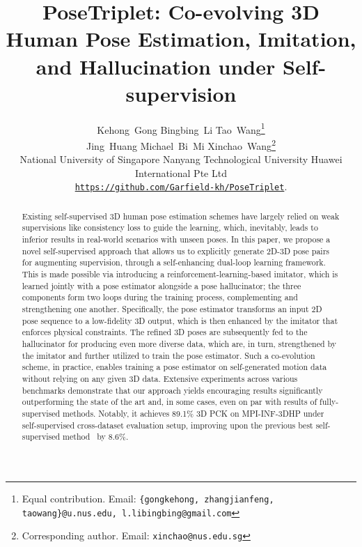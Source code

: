 \documentclass[10pt,twocolumn,letterpaper]{article}
\begin{document}
\title{PoseTriplet: Co-evolving 3D Human Pose Estimation, Imitation, and Hallucination under Self-supervision}










\author{
{Kehong~Gong\footnotemark[1]} \qquad \quad  
{Bingbing~Li\footnotemark[1]}  \quad  {}  \quad  \qquad 
{Tao~Wang\thanks{Equal contribution. 
Email: {\tt \{gongkehong, zhangjianfeng, taowang\}@u.nus.edu,
l.libingbing@gmail.com}}} \quad  \qquad \\
\quad 
{Jing~Huang} \qquad \quad  
{Michael~Bi~Mi}  \quad  {}  \quad  \qquad 
{Xinchao~Wang\footnotemark[2]\thanks{Corresponding author. Email: {\tt xinchao@nus.edu.sg}}} \quad  \qquad \\ 
\normalsize{National University of Singapore} \quad
\normalsize{Nanyang Technological University} \quad
\normalsize{Huawei International Pte Ltd }\\
{\tt \small{\url{https://github.com/Garfield-kh/PoseTriplet}}}.
}


\maketitle

\begin{abstract}
Existing self-supervised 3D human pose estimation schemes
have largely relied on weak supervisions like
consistency loss to guide the learning,
which, inevitably, leads to
inferior results in real-world 
scenarios with unseen poses. 
In this paper, we propose a novel self-supervised
approach that allows us to explicitly
generate 2D-3D pose pairs
for augmenting supervision,
through a self-enhancing 
dual-loop learning framework. 
This is made possible via 
introducing a
reinforcement-learning-based
imitator, which is learned jointly
with a pose estimator
alongside a pose hallucinator;
the three components
form two loops during the training process, 
complementing and strengthening one another. 
Specifically, 
the pose estimator transforms an input 2D pose sequence 
to a low-fidelity 3D output,
which is then enhanced by the imitator that
enforces physical constraints.
The refined 3D poses are subsequently 
fed to the hallucinator
for producing even more diverse data,
which are, in turn, 
strengthened by the imitator and further utilized to 
train the pose estimator. 
Such a co-evolution scheme, in practice, 
enables training a pose estimator 
on self-generated motion data without relying on any given 3D  data.
Extensive experiments 
across various  benchmarks
demonstrate that 
our approach yields encouraging 
results  significantly outperforming
the state of the art
and,
in some cases, even on par
with results of fully-supervised methods. 
{Notably, it achieves 89.1\% 3D PCK on MPI-INF-3DHP under self-supervised cross-dataset evaluation setup, improving upon the previous best self-supervised method~\cite{hu2021unsupervised, kundu2020self} by 8.6\%.}
\end{abstract} \vspace{-2mm}
\end{document}
